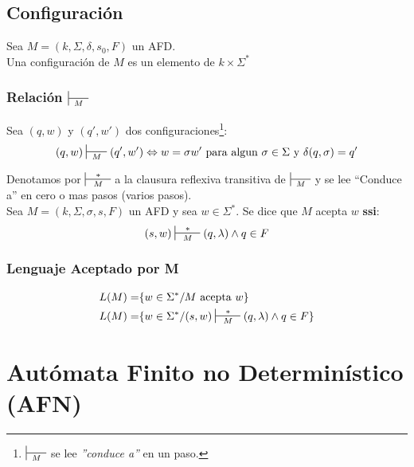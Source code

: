 \subsection{Configuración}
Sea $M=(k,\Sigma,\delta,s_0,F)$ un AFD. \\ $ { } $ \\ 
Una configuración de $M$ es un elemento de $k\times\Sigma^*$
\subsubsection{Relación $\sststile{M}{\hspace{0.25cm}  \hspace{0.25cm}}$}
Sea $(q,w)$ y $(q',w')$ dos configuraciones\footnote{$\sststile{M}{\hspace{0.25cm} \hspace{0.25cm}}$ se lee \textit{''conduce a''} en un paso.}:
$$
(q,w)\sststile{M}{\hspace{0.25cm} \hspace{0.25cm}} (q',w')\Leftrightarrow w = \sigma w' \text{ para algun } \sigma\in\Sigma \text{ y } \delta(q,\sigma)=q'
$$

Denotamos por $\sststile{M}{\hspace{0.25cm} * \hspace{0.25cm}}$ a la clausura reflexiva transitiva de $\sststile{M}{\hspace{0.25cm}  \hspace{0.25cm}}$ y se lee ``Conduce a'' en cero o mas pasos (varios pasos). \\${ }$\\
Sea $M=(k,\Sigma,\sigma,s,F)$ un AFD y sea $w\in\Sigma^*$. Se dice que $M$ acepta $w$ \textbf{ssi}:
$$
	(s,w) \sststile{M}{\hspace{0.25cm} * \hspace{0.25cm}} (q,\lambda) \wedge q\in F
$$
\subsubsection{Lenguaje Aceptado por M}
\begin{align*}
L(M) = & \{ w\in\Sigma^* / M \text{ acepta } w\} \\
L(M) = & \{ w\in\Sigma^* / (s,w) \sststile{M}{\hspace{0.25cm} * \hspace{0.25cm}} (q,\lambda) \wedge q\in F\}
\end{align*}
\section{Autómata Finito no Determinístico (AFN)}
